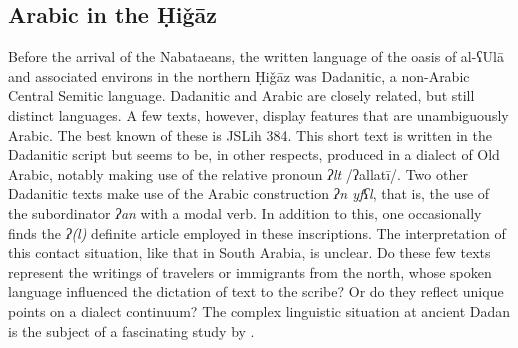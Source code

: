 \documentclass[output=paper]{langsci/langscibook}
\begin{document}
\subsection{Arabic in the Ḥiǧāz}
Before the arrival of the Nabataeans, the written language of the oasis of al-ʕUlā and associated environs in the northern Ḥiǧāz was Dadanitic, a non-Arabic Central Semitic language. Dadanitic and Arabic are closely related, but still distinct languages. A few texts, however, display features that are unambiguously Arabic. The best known of these is JSLih 384. This short text is written in the Dadanitic script but seems to be, in other respects, produced in a dialect of Old Arabic, notably making use of the relative pronoun \textit{ʔlt} /ʔallatī/. Two other Dadanitic texts make use of the Arabic construction \textit{ʔn yfʕl}, that is, the use of the subordinator \textit{ʔan} with a modal verb. In addition to this, one occasionally finds the \textit{ʔ(l)} definite article employed in these inscriptions. The interpretation of this contact situation, like that in South Arabia, is unclear. Do these few texts represent the writings of travelers or immigrants from the north, whose spoken language influenced the dictation of text to the scribe? Or do they reflect unique points on a dialect continuum? The complex linguistic situation at ancient Dadan is the subject of a fascinating study by \citet{Kootstra2019}.
\end{document}
